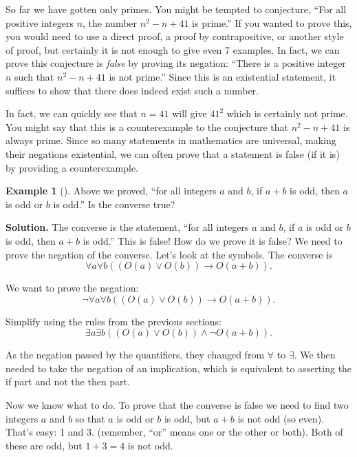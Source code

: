 \documentclass[10pt,]{book}
\theoremstyle{plain}
\theoremstyle{definition}
\theoremstyle{definition}
\newtheorem{example}[theorem]{Example}
\theoremstyle{definition}
\numberwithin{equation}{chapter}
\def\imp{\rightarrow}
\begin{document}
\par
\hypertarget{p-2476}{}%
So far we have gotten only primes. You might be tempted to conjecture, ``For all positive integers \(n\), the number \(n^2 - n + 41\) is prime.'' If you wanted to prove this, you would need to use a direct proof, a proof by contrapositive, or another style of proof, but certainly it is not enough to give even 7 examples. In fact, we can prove this conjecture is \emph{false} by proving its negation: ``There is a positive integer \(n\) such that \(n^2 - n + 41\) is not prime.'' Since this is an existential statement, it suffices to show that there does indeed exist such a number.%
\par
\hypertarget{p-2477}{}%
In fact, we can quickly see that \(n = 41\) will give \(41^2\) which is certainly not prime. You might say that this is a counterexample to the conjecture that \(n^2 - n + 41\) is always prime. Since so many statements in mathematics are universal, making their negations existential, we can often prove that a statement is false (if it is) by providing a counterexample.%
\begin{example}[]\label{example-52}
\hypertarget{p-2478}{}%
Above we proved, ``for all integers \(a\) and \(b\), if \(a+b\) is odd, then \(a\) is odd or \(b\) is odd.'' Is the converse true?%
\par\smallskip%
\noindent\textbf{Solution.}\hypertarget{solution-296}{}\quad%
\hypertarget{p-2479}{}%
The converse is the statement, ``for all integers \(a\) and \(b\), if \(a\) is odd or \(b\) is odd, then \(a + b\) is odd.'' This is false! How do we prove it is false? We need to prove the negation of the converse. Let's look at the symbols. The converse is%
\begin{equation*}
\forall a \forall b ((O(a) \vee O(b)) \imp O(a+b)).
\end{equation*}
%
\par
\hypertarget{p-2480}{}%
We want to prove the negation:%
\begin{equation*}
\neg \forall a \forall b ((O(a) \vee O(b)) \imp O(a+b)).
\end{equation*}
%
\par
\hypertarget{p-2481}{}%
Simplify using the rules from the previous sections:%
\begin{equation*}
\exists a \exists b ((O(a) \vee O(b)) \wedge \neg O(a+b)).
\end{equation*}
%
\par
\hypertarget{p-2482}{}%
As the negation passed by the quantifiers, they changed from \(\forall\) to \(\exists\). We then needed to take the negation of an implication, which is equivalent to asserting the if part and not the then part.%
\par
\hypertarget{p-2483}{}%
Now we know what to do. To prove that the converse is false we need to find two integers \(a\) and \(b\) so that \(a\) is odd or \(b\) is odd, but \(a+b\) is not odd (so even). That's easy: 1 and 3. (remember, ``or'' means one or the other or both). Both of these are odd, but \(1+3 = 4\) is not odd.%
\end{example}
\typeout{************************************************}
\typeout{************************************************}
\end{document}

